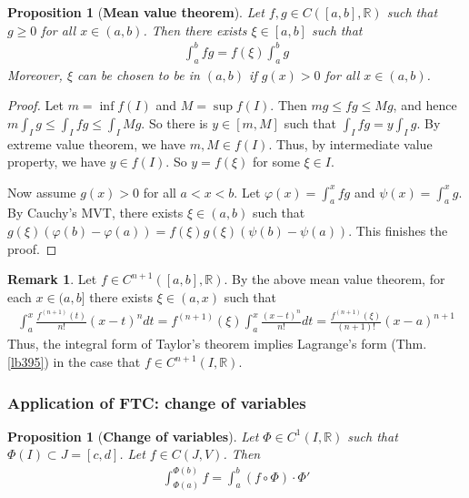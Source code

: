 \documentclass[12pt,b5paper,notitlepage]{article}
\theoremstyle{definition}
\newtheorem{rem}[df]{Remark}
\theoremstyle{plain}
\newtheorem{pp}[df]{Proposition}
\newcommand{\Rbb}{\mathbb R}
\numberwithin{equation}{section}
\begin{document}
\begin{pp}[\textbf{Mean value theorem}]
Let $f,g\in C([a,b],\Rbb)$ such that $g\geq 0$ for all $x\in(a,b)$. Then there exists $\xi\in [a,b]$ such that
\begin{align}
\int_a^bfg=f(\xi)\int_a^bg
\end{align}
Moreover, $\xi$ can be chosen to be in $(a,b)$ if $g(x)>0$ for all $x\in(a,b)$.
\end{pp}

\begin{proof}
Let $m=\inf f(I)$ and $M=\sup f(I)$. Then $mg\leq fg\leq Mg$, and hence $m\int_Ig\leq \int_Ifg\leq \int_IMg$. So there is $y\in [m,M]$ such that $\int_Ifg=y\int_Ig$. By extreme value theorem, we have $m,M\in f(I)$. Thus, by intermediate value property, we have $y\in f(I)$. So $y=f(\xi)$ for some $\xi\in I$.

Now assume $g(x)>0$ for all $a<x<b$. Let $\varphi(x)=\int_a^xfg$ and $\psi(x)=\int_a^xg$. By Cauchy's MVT, there exists $\xi\in(a,b)$ such that $g(\xi)(\varphi(b)-\varphi(a))=f(\xi)g(\xi)(\psi(b)-\psi(a))$. This finishes the proof.
\end{proof}



\begin{rem}
Let $f\in C^{n+1}([a,b],\Rbb)$. By the above mean value theorem, for each $x\in(a,b]$ there exists $\xi\in(a,x)$ such that
\begin{align*}
\int_a^x\frac{f^{(n+1)}(t)}{n!}(x-t)^ndt=f^{(n+1)}(\xi)\int_a^x\frac{(x-t)^n}{n!}dt=\frac{f^{(n+1)}(\xi)}{(n+1)!}(x-a)^{n+1}
\end{align*}
Thus, the integral form of Taylor's theorem implies Lagrange's form (Thm. \ref{lb395}) in the case that $f\in C^{n+1}(I,\Rbb)$.
\end{rem}


\subsubsection{Application of FTC: change of variables}



\begin{pp}[\textbf{Change of variables}]\label{lb396}
Let $\Phi\in C^1(I,\Rbb)$ such that $\Phi(I)\subset J=[c,d]$. Let $f\in C(J,V)$. Then
\begin{align}
\int_{\Phi(a)}^{\Phi(b)} f=\int_a^b(f\circ\Phi)\cdot\Phi'
\end{align}
\end{pp}
\end{document}
